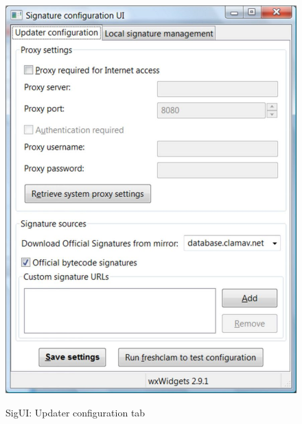 \begin{figure}[htb]
\caption{SigUI: Updater configuration tab}
\centering
\includegraphics{sigui_tab1.jpg}
\label{fig:tab1}
\end{figure}

